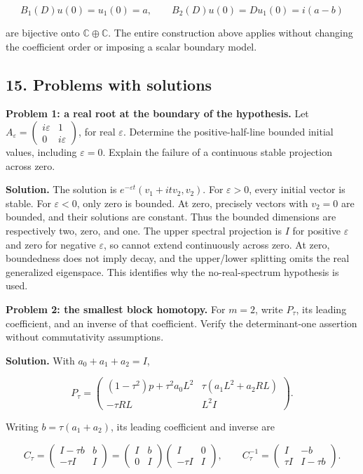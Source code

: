 \documentclass[
  11pt,
]{article}
\begin{document}
\[
B_1(D)u(0)=u_1(0)=a,\qquad
B_2(D)u(0)=Du_1(0)=i(a-b)
\]

are bijective onto \(\mathbb C\oplus\mathbb C\). The entire construction
above applies without changing the coefficient order or imposing a
scalar boundary model.

\subsection{15. Problems with solutions}\label{problems-with-solutions}

\textbf{Problem 1: a real root at the boundary of the hypothesis.} Let
\(A_\varepsilon=\left(\begin{smallmatrix}i\varepsilon&1\\0&i\varepsilon\end{smallmatrix}\right)\),
for real \(\varepsilon\). Determine the positive-half-line bounded
initial values, including \(\varepsilon=0\). Explain the failure of a
continuous stable projection across zero.

\textbf{Solution.} The solution is
\(e^{-\varepsilon t}(v_1+itv_2,v_2)\). For \(\varepsilon>0\), every
initial vector is stable. For \(\varepsilon<0\), only zero is bounded.
At zero, precisely vectors with \(v_2=0\) are bounded, and their
solutions are constant. Thus the bounded dimensions are respectively
two, zero, and one. The upper spectral projection is \(I\) for positive
\(\varepsilon\) and zero for negative \(\varepsilon\), so cannot extend
continuously across zero. At zero, boundedness does not imply decay, and
the upper/lower splitting omits the real generalized eigenspace. This
identifies why the no-real-spectrum hypothesis is used.

\textbf{Problem 2: the smallest block homotopy.} For \(m=2\), write
\(P_\tau\), its leading coefficient, and an inverse of that coefficient.
Verify the determinant-one assertion without commutativity assumptions.

\textbf{Solution.} With \(a_0+a_1+a_2=I\),

\[
P_\tau=
\begin{pmatrix}
(1-\tau^2)p+\tau^2a_0L^2&\tau(a_1L^2+a_2RL)\\
-\tau RL&L^2I
\end{pmatrix}.
\]

Writing \(b=\tau(a_1+a_2)\), its leading coefficient and inverse are

\[
C_\tau=
\begin{pmatrix}I-\tau b&b\\-\tau I&I\end{pmatrix}
=\begin{pmatrix}I&b\\0&I\end{pmatrix}
\begin{pmatrix}I&0\\-\tau I&I\end{pmatrix},
\qquad
C_\tau^{-1}=
\begin{pmatrix}I&-b\\\tau I&I-\tau b\end{pmatrix}.
\]
\end{document}
